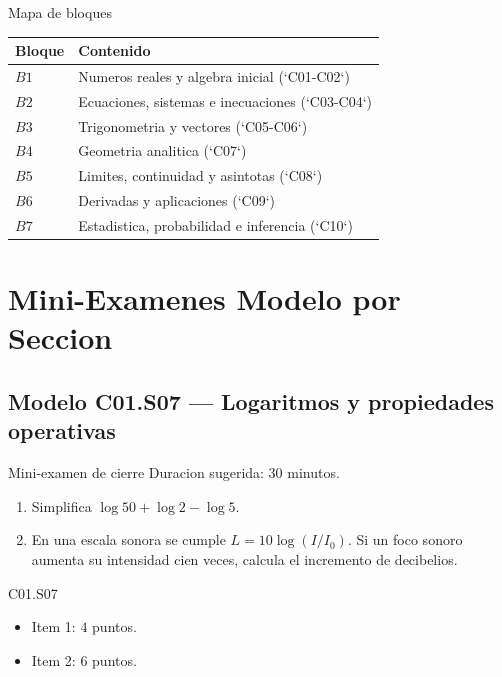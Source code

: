 \begin{databox}{Mapa de bloques}
\begin{center}
\begin{tabular}{ll}
\toprule
Bloque & Contenido \\
\midrule
\(B1\) & Numeros reales y algebra inicial (`C01-C02`) \\
\(B2\) & Ecuaciones, sistemas e inecuaciones (`C03-C04`) \\
\(B3\) & Trigonometria y vectores (`C05-C06`) \\
\(B4\) & Geometria analitica (`C07`) \\
\(B5\) & Limites, continuidad y asintotas (`C08`) \\
\(B6\) & Derivadas y aplicaciones (`C09`) \\
\(B7\) & Estadistica, probabilidad e inferencia (`C10`) \\
\bottomrule
\end{tabular}
\end{center}
\end{databox}

\chapter{Mini-Examenes Modelo por Seccion}

\section{Modelo C01.S07 --- Logaritmos y propiedades operativas}

\begin{exambrief}{Mini-examen de cierre}
Duracion sugerida: \(30\) minutos.
\begin{enumerate}
  \item Simplifica \(\log 50+\log 2-\log 5\).
  \item En una escala sonora se cumple \(L=10\log(I/I_0)\). Si un foco sonoro aumenta su
  intensidad cien veces, calcula el incremento de decibelios.
\end{enumerate}
\end{exambrief}

\begin{rubricbox}{C01.S07}
\begin{itemize}
  \item Item 1: \(4\) puntos.
  \item Item 2: \(6\) puntos.
\end{itemize}
\end{rubricbox}

